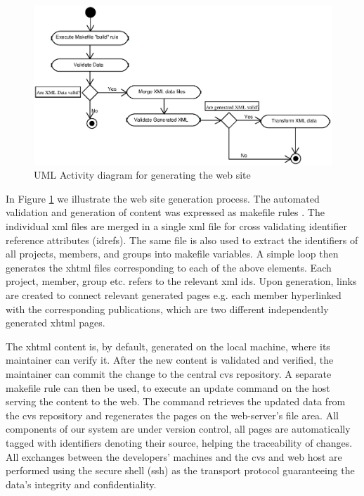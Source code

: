 \documentclass[10pt]{article}
\begin{document}
\begin{figure}[h!]
\includegraphics[scale=0.6]{generate-web-site}
\caption{UML Activity diagram for generating the web site}
\label{fig:generate-web-site}
\end{figure}

In Figure \ref{fig:generate-web-site} we illustrate the web site generation process.
The automated validation and generation of content was
expressed as makefile rules \cite{OTT91}.
The individual {\sc xml} files are merged in a
single {\sc xml} file for cross validating identifier
reference attributes ({\sc idref}s).
The same file is also used to extract the identifiers of
all projects, members, and groups into makefile
variables.
A simple loop then generates the {\sc xhtml} files
corresponding to each of the above elements.
Each project, member, group etc. refers to the relevant {\sc xml id}s.
Upon generation, links are created to
connect relevant generated pages e.g. each member hyperlinked with the corresponding publications, 
which are two different independently generated {\sc xhtml} pages.

The {\sc xhtml} content is, by default, generated on the
local machine, where its maintainer can verify it.
After the new content is validated and verified,
the maintainer can commit the change to the central {\sc cvs} repository. 
A separate makefile rule can then be used,
to execute an update command on the
host serving the content to the web.
The command retrieves the updated data from the {\sc cvs}
repository and regenerates the pages on the web-server's
file area.
All components of our system are under version control,
all pages are automatically tagged with identifiers
denoting their source, helping the traceability of changes.
All exchanges between the developers' machines and the
{\sc cvs} and web host are performed using the secure
shell ({\sc ssh}) as the transport protocol guaranteeing the data's integrity
and confidentiality.
\end{document}

